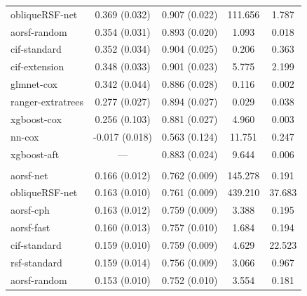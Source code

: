 \documentclass{article}\usepackage[]{graphicx}\usepackage[]{xcolor}
\newenvironment{knitrout}{}{} %
\begin{document}
\begin{knitrout}
\begin{longtable}[t]{lcccc}
\hspace{1em}obliqueRSF-net & 0.369 (0.032) & 0.907 (0.022) & 111.656 & 1.787\\
\hspace{1em}aorsf-random & 0.354 (0.031) & 0.893 (0.020) & 1.093 & 0.018\\
\hspace{1em}cif-standard & 0.352 (0.034) & 0.904 (0.025) & 0.206 & 0.363\\
\hspace{1em}cif-extension & 0.348 (0.033) & 0.901 (0.023) & 5.775 & 2.199\\
\hspace{1em}glmnet-cox & 0.342 (0.044) & 0.886 (0.028) & 0.116 & 0.002\\
\hspace{1em}ranger-extratrees & 0.277 (0.027) & 0.894 (0.027) & 0.029 & 0.038\\
\hspace{1em}xgboost-cox & 0.256 (0.103) & 0.881 (0.027) & 4.960 & 0.003\\
\hspace{1em}nn-cox & -0.017 (0.018) & 0.563 (0.124) & 11.751 & 0.247\\
\hspace{1em}xgboost-aft & --- & 0.883 (0.024) & 9.644 & 0.006\\
\addlinespace[0.3em]
\multicolumn{5}{l}{\textit{\textbf{Rotterdam tumor bank; death, n = 2982, p = 11}}}\\
\hline
\hspace{1em}aorsf-net & 0.166 (0.012) & 0.762 (0.009) & 145.278 & 0.191\\
\hspace{1em}obliqueRSF-net & 0.163 (0.010) & 0.761 (0.009) & 439.210 & 37.683\\
\hspace{1em}aorsf-cph & 0.163 (0.012) & 0.759 (0.009) & 3.388 & 0.195\\
\hspace{1em}aorsf-fast & 0.160 (0.013) & 0.757 (0.010) & 1.684 & 0.194\\
\hspace{1em}cif-standard & 0.159 (0.010) & 0.759 (0.009) & 4.629 & 22.523\\
\hspace{1em}rsf-standard & 0.159 (0.014) & 0.756 (0.009) & 3.066 & 0.967\\
\hspace{1em}aorsf-random & 0.153 (0.010) & 0.752 (0.010) & 3.554 & 0.181\\

\end{longtable}
\end{knitrout}
\end{document}
